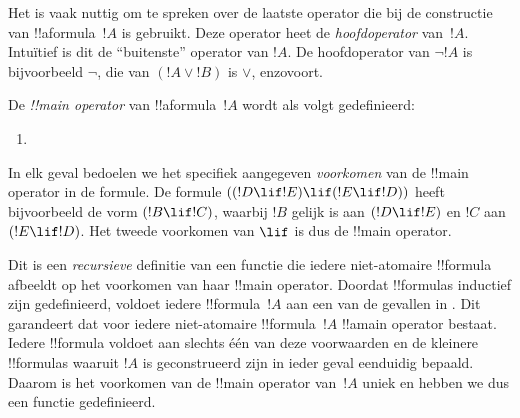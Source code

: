 \documentclass[../../../include/open-logic-section]{subfiles}
\begin{document}


\begin{explain}
Het is vaak nuttig om te spreken over de laatste operator die bij de
constructie van !!a{formula}~$!A$ is gebruikt. Deze operator heet de
\emph{hoofdoperator} van~$!A$. Intuïtief is dit de ``buitenste''
operator van $!A$. De hoofdoperator van $\lnot !A$ is bijvoorbeeld
$\lnot$, die van $(!A \lor !B)$ is $\lor$, enzovoort.
\end{explain}


\begin{defn}
De \emph{!!{main operator}} van !!a{formula}~$!A$ wordt als volgt
gedefinieerd:
\begin{enumerate}
\item {}







\end{enumerate}
\end{defn}

In elk geval bedoelen we het specifiek aangegeven \emph{voorkomen} van
de !!{main operator} in de formule. De formule
$((!D \lif !E) \lif (!E \lif !D))$ heeft bijvoorbeeld de vorm $(!B \lif !C)$,
waarbij $!B$ gelijk is aan $(!D \lif !E)$ en $!C$ aan $(!E \lif !D)$.
Het tweede voorkomen van $\lif$ is dus de !!{main operator}.

\begin{explain}
Dit is een \emph{recursieve} definitie van een functie die iedere
niet-atomaire !!{formula} afbeeldt op het voorkomen van haar !!{main
  operator}. Doordat !!{formula}s inductief zijn gedefinieerd, voldoet
iedere !!{formula}~$!A$ aan een van de gevallen in
. Dit garandeert dat voor iedere niet-atomaire
!!{formula}~$!A$ !!a{main operator} bestaat. Iedere !!{formula} voldoet
aan slechts één van deze voorwaarden en de kleinere !!{formula}s
waaruit $!A$ is geconstrueerd zijn in ieder geval eenduidig bepaald.
Daarom is het voorkomen van de !!{main operator} van~$!A$ uniek en
hebben we dus een functie gedefinieerd.
\end{explain}
\end{document}
